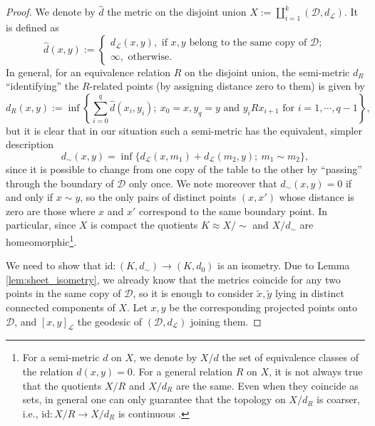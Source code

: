 \documentclass[reqno,11pt]{amsart}
\begin{document}
\begin{proof}
    We denote by \( \widehat d \) the metric on the disjoint union \( X :=\coprod_{i=1}^k(\mathcal{D}, d_\mathcal{L}) \).
    It is defined as
    \[
        \widehat d(x,y) := \begin{cases}
            d_\mathcal{L}(x,y), \text{ if } x, y \text{ belong to the same copy of } \mathcal{D}; \\
            \infty, \text{ otherwise}.
        \end{cases}
    \]
    In general, for an equivalence relation \( R \) on the disjoint union, the semi-metric \(d_R\) ``identifying'' the \( R \)-related points (by assigning distance zero to them) is given by
    \[
        d_R(x,y) := \inf\left\{\sum_{i=0}^q\widehat d(x_i, y_i);\  x_0 = x, y_q = y \text{ and } y_i R x_{i+1} \text{ for } i = 1, \cdots, q-1\right\},
    \]
    but it is clear that in our situation such a semi-metric has the equivalent, simpler description
    \[
        d_\sim(x,y) = \inf\{d_\mathcal{L}(x, m_1) + d_\mathcal{L}(m_2, y); \  m_1 \sim m_2\},
    \]
    since it is possible to change from one copy of the table to the other by ``passing'' through the boundary of \( \mathcal{D} \) only once. 
    We note moreover that \(d_\sim (x,y) = 0 \) if and only if \( x \sim y \), so the only pairs of distinct points \( (x, x') \) whose distance is zero are  those where \(x\) and \(x'\) correspond to the same boundary point. 
    In particular, since \(X\) is compact the quotients \(K \approx X \big/\!\!\sim\) and \( X\big/d_\sim \) are homeomorphic\footnote{
       For a semi-metric \(d\) on \(X\), we denote by \( X\big/d\) the set of equivalence classes of the relation \(d(x,y) = 0\). For a general relation \(R\) on \(X\), it is not always true that the quotients \(X \big/R\) and \(X\big/d_R\) are the same. Even when they coincide as sets, in general one can only guarantee that the topology on \(X\big/d_R\) is coarser, i.e., \(\mathrm{id}\colon X\big/R \to X\big/d_R\) is continuous \cite{burago2022course}.
    }. 
    \par We need to show that \( \mathrm{id}\colon (K,d_\sim) \to (K, d_0 ) \) is an isometry.
    Due to Lemma \ref{lem:sheet_isometry}, we already know that the metrics coincide for any two points in the same copy of \(\mathcal{D}\), so it is enough to consider \(\widetilde x,\widetilde y\) lying in distinct connected components of \(X\). 
    Let \(x, y\) be the corresponding projected points onto \(\mathcal{D}\), and \([x,y]_\mathcal{L}\) the geodesic of \( (\mathcal{D}, d_\mathcal{L}) \) joining them. 

\end{proof}
\end{document}

